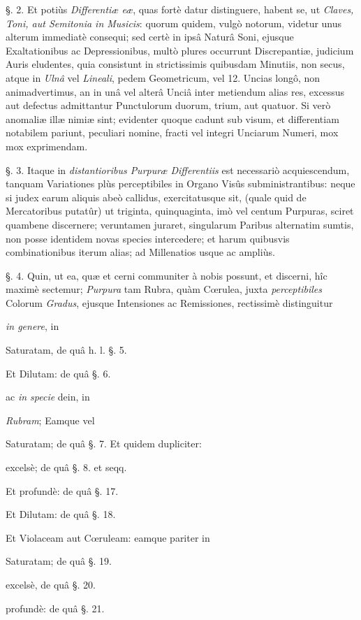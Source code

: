 \documentclass[a4paper, 11pt, oneside, polutonikogreek, german]{article}
\begin{document}
§. 2. Et potiùs \emph{Differentiæ eæ}, quas fortè datur distinguere, habent se, ut \emph{Claves, Toni, aut Semitonia in Musicis}: quorum quidem, vulgò notorum, videtur unus alterum immediatè consequi; sed certè in ipsâ Naturâ Soni, ejusque Exaltationibus ac Depressionibus, multò plures occurrunt Discrepantiæ, judicium Auris eludentes, quia consistunt in strictissimis quibusdam Minutiis, non secus, atque in \emph{Ulnâ} vel \emph{Lineali}, pedem Geometricum, vel 12. Uncias longô, non animadvertimus, an in unâ vel alterâ Unciâ inter metiendum alias res, excessus aut defectus admittantur Punctulorum duorum, trium, aut quatuor. Si verò anomaliæ illæ nimiæ sint; evidenter quoque cadunt sub visum, et differentiam notabilem pariunt, peculiari nomine, fracti vel integri Unciarum Numeri, mox mox exprimendam.

§. 3. Itaque in \emph{distantioribus Purpuræ Differentiis} est necessariò acquiescendum, tanquam Variationes plùs perceptibiles in Organo Visûs subministrantibus: neque si judex earum aliquis abeò callidus, exercitatusque sit, (quale quid de Mercatoribus putatûr) ut triginta, quinquaginta, imò vel centum Purpuras, sciret quambene discernere; veruntamen juraret, singularum Paribus alternatim sumtis, non posse identidem novas species intercedere; et harum quibusvis combinationibus iterum alias; ad Millenatios usque ac ampliùs.

§. 4. Quin, ut ea, quæ et cerni communiter à nobis possunt, et discerni, hîc maximè sectemur; \emph{Purpura} tam Rubra, quàm Cœrulea, juxta \emph{perceptibiles} Colorum \emph{Gradus}, ejusque Intensiones ac Remissiones, rectissimè distinguitur

\emph{in genere}, in

Saturatam, de quâ h. l. §. 5.

Et Dilutam: de quâ §. 6.

ac \emph{in specie} dein, in

\emph{Rubram}; Eamque vel

Saturatam; de quâ §. 7. Et quidem dupliciter:

excelsè; de quâ §. 8. et seqq.

Et profundè: de quâ §. 17.

Et Dilutam: de quâ §. 18.

Et Violaceam aut Cœruleam: eamque pariter in

Saturatam; de quâ §. 19.

excelsè, de quâ §. 20.

profundè: de quâ §. 21.
\end{document}
